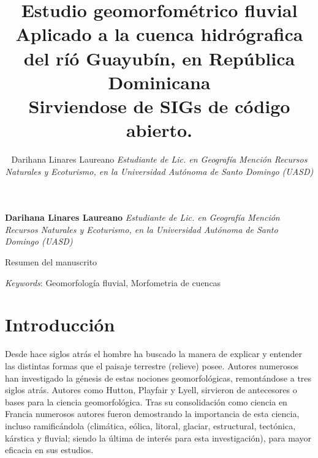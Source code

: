 \documentclass[11pt,]{article}
\title{Estudio geomorfométrico fluvial\\
Aplicado a la cuenca hidrógrafica del ríó Guayubín, en República
Dominicana\\
Sirviendose de SIGs de código abierto.  }
\author{\Large Darihana Linares Laureano\vspace{0.05in} \newline\normalsize\emph{Estudiante de Lic. en Geografía Mención Recursos Naturales y Ecoturismo,
en la Universidad Autónoma de Santo Domingo (UASD)}  }
\date{}
\newcommand*{\authorfont}{\fontfamily{phv}\selectfont}
\renewenvironment{abstract}
 {{%
    \setlength{\leftmargin}{0mm}
    \setlength{\rightmargin}{\leftmargin}%
  }%
  \relax}
 {\endlist}
\begin{document}
	
%

{%
\setlength{\parindent}{0pt}
\thispagestyle{plain}
{\fontsize{18}{20}\selectfont\raggedright 
\maketitle  %

}

{
   \vskip 13.5pt\relax \normalsize\fontsize{11}{12} 
\textbf{\authorfont Darihana Linares Laureano} \hskip 15pt \emph{\small Estudiante de Lic. en Geografía Mención Recursos Naturales y Ecoturismo,
en la Universidad Autónoma de Santo Domingo (UASD)}   

}

}








\begin{abstract}

    \hbox{\vrule height .2pt width 39.14pc}

    \vskip 8.5pt %

\noindent Resumen del manuscrito


\vskip 8.5pt \noindent \emph{Keywords}: Geomorfología fluvial, Morfometria de cuencas \par

    \hbox{\vrule height .2pt width 39.14pc}



\end{abstract}


\vskip 6.5pt


\noindent  \section{Introducción}\label{introducciuxf3n}

Desde hace siglos atrás el hombre ha buscado la manera de explicar y
entender las distintas formas que el paisaje terrestre (relieve) posee.
Autores numerosos han investigado la génesis de estas nociones
geomorfológicas, remontándose a tres siglos atrás. Autores como Hutton,
Playfair y Lyell, sirvieron de antecesores o bases para la ciencia
geomorfológica. Tras su consolidación como ciencia en Francia numerosos
autores fueron demostrando la importancia de esta ciencia, incluso
ramificándola (climática, eólica, litoral, glaciar, estructural,
tectónica, kárstica y fluvial; siendo la última de interés para esta
investigación), para mayor eficacia en sus estudios.
\end{document}
